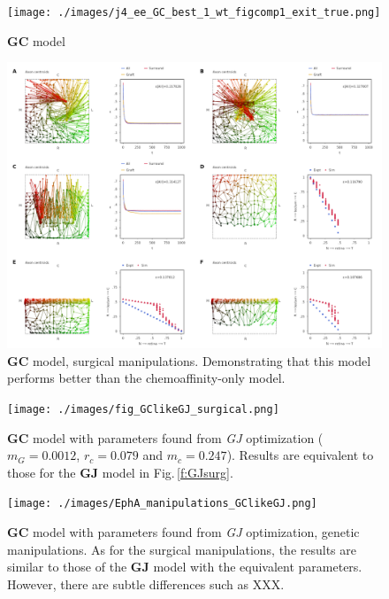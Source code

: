 \documentclass[11pt, a4paper]{article}
\begin{document}
\begin{figure}
\texttt{[image: ./images/j4\_ee\_GC\_best\_1\_wt\_figcomp1\_exit\_true.png]}
\caption{$\mathbf{GC}$ model}
\label{f:GC}
\end{figure}

\begin{figure}
\includegraphics[width=\linewidth]{./images/fig_GC_surgical.png}
\caption{$\mathbf{GC}$ model, surgical manipulations. Demonstrating that this
model performs better than the chemoaffinity-only model.}
\label{f:GCsurg}
\end{figure}

\begin{figure}
\texttt{[image: ./images/fig\_GClikeGJ\_surgical.png]}
\caption{$\mathbf{GC}$ model with parameters found from \emph{GJ}
optimization ( $m_G = 0.0012$, $r_c = 0.079$ and $m_c = 0.247$). Results are
equivalent to those for the $\mathbf{GJ}$ model in Fig.\,\ref{f:GJsurg}.}
\label{f:GClikeGJsurg}
\end{figure}

\begin{figure}
\texttt{[image: ./images/EphA\_manipulations\_GClikeGJ.png]}
\caption{$\mathbf{GC}$ model with parameters found from \emph{GJ}
optimization, genetic manipulations. As for the surgical manipulations, the
results are similar to those of the $\mathbf{GJ}$ model with the equivalent
parameters. However, there are subtle differences such as XXX.}
\label{f:GClikeGJeph}
\end{figure}


\end{document}
